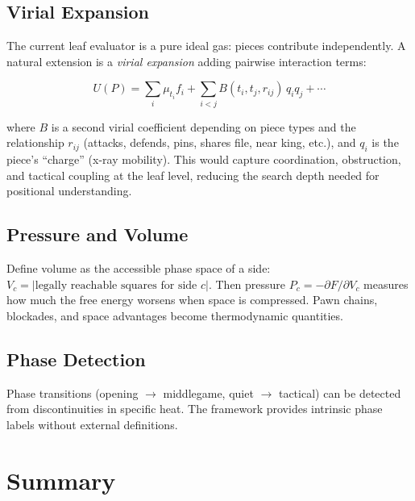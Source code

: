 \documentclass[11pt,a4paper]{article}
\begin{document}
\subsection{Virial Expansion}

The current leaf evaluator is a pure ideal gas: pieces contribute
independently. A natural extension is a \emph{virial expansion} adding
pairwise interaction terms:

\begin{equation}
U(P) = \sum_i \mu_{t_i} f_i + \sum_{i < j} B(t_i, t_j, r_{ij}) \, q_i
q_j + \cdots
\end{equation}

where $B$ is a second virial coefficient depending on piece types and the
relationship $r_{ij}$ (attacks, defends, pins, shares file, near king,
etc.), and $q_i$ is the piece's ``charge'' (x-ray mobility). This would
capture coordination, obstruction, and tactical coupling at the leaf level,
reducing the search depth needed for positional understanding.

\subsection{Pressure and Volume}

Define volume as the accessible phase space of a side:
$V_c = |\text{legally reachable squares for side } c|$.
Then pressure $P_c = -\partial F / \partial V_c$ measures how much the
free energy worsens when space is compressed. Pawn chains, blockades, and
space advantages become thermodynamic quantities.

\subsection{Phase Detection}

Phase transitions (opening $\to$ middlegame, quiet $\to$ tactical) can be
detected from discontinuities in specific heat. The framework provides
intrinsic phase labels without external definitions.

\section{Summary}
\end{document}
